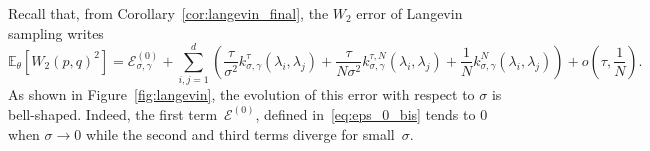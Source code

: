 \documentclass[11pt]{article}
\begin{document}
Recall that, from Corollary~\ref{cor:langevin_final}, the $W_2$ error of Langevin sampling writes
\begin{equation} \label{eq:langevin_W2_bis}
 \! \! \mathbb{E}_{\theta}\left[  W_2\left(p, q\right)^2 \right] \! =  
 \mathcal{E}^{(0)}_{\sigma, \gamma} \! +  \! \!  \sum_{i,j = 1}^d  \! \left( \! \frac{\tau}{\sigma^2} k_{\sigma, \gamma}^\tau (\lambda_i, \lambda_j)  \! +  \!\frac{\tau}{N \sigma^2} k_{\sigma, \gamma}^{\tau, N}(\lambda_i, \lambda_j)  \!+  \! \frac{1}{N} k_{\sigma, \gamma}^N(\lambda_i, \lambda_j) \! \right)  \! + \! o\left(\! \tau, \frac{1}{N} \! \right). 
 \end{equation} 
As shown in Figure~\ref{fig:langevin}, the evolution of this error with respect to $\sigma$ is bell-shaped. Indeed, the first term~$\mathcal{E}^{(0)}$, defined in~\eqref{eq:eps_0_bis} tends to $0$ when $\sigma \to 0$ while the second and third terms diverge for small~\(\sigma\).
\end{document}

